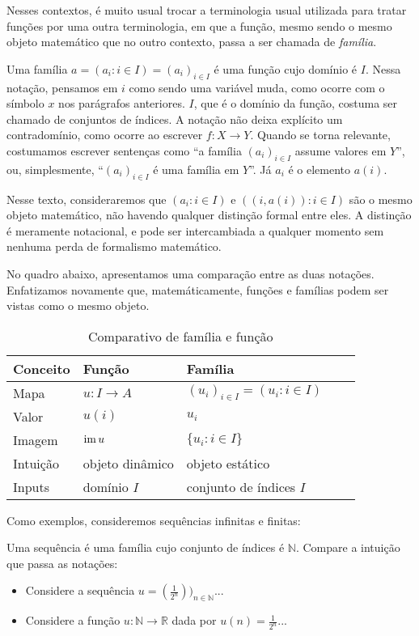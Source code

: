 Nesses contextos, é muito usual trocar a terminologia usual utilizada para tratar funções por uma outra terminologia, em que a função, mesmo sendo o mesmo objeto matemático que no outro contexto, passa a ser chamada de \emph{família}.

Uma família $a=(a_i: i \in I)=(a_i)_{i \in I}$ é uma função cujo domínio é $I$.
Nessa notação, pensamos em $i$ como sendo uma variável muda, como ocorre com o símbolo $x$ nos parágrafos anteriores.
$I$, que é o domínio da função, costuma ser chamado de conjuntos de índices.
A notação não deixa explícito um contradomínio, como ocorre ao escrever $f:X\rightarrow Y$.
Quando se torna relevante, costumamos escrever sentenças como ``a família $(a_i)_{i \in I}$ assume valores em $Y$'', ou, simplesmente, ``$(a_i)_{i \in I}$ é uma família em $Y$''.
Já $a_i$ é o elemento $a(i)$.

Nesse texto, consideraremos que $(a_i: i \in I)$ e $((i, a(i)): i \in I)$ são o mesmo objeto matemático, não havendo qualquer distinção formal entre eles.
A distinção é meramente notacional, e pode ser intercambiada a qualquer momento sem nenhuma perda de formalismo matemático.

No quadro abaixo, apresentamos uma comparação entre as duas notações.
Enfatizamos novamente que, matemáticamente, funções e famílias podem ser vistas como o mesmo objeto.
\begin{table}[h]
    \centering
    \begin{tabular}{lllll}
        \hline
        \textbf{Conceito} & \textbf{Função} & \textbf{Família} \\ \hline
        Mapa & $u:I\rightarrow A$ & $(u_i)_{i \in I}=(u_i: i \in I)$ \\
        Valor & $u(i)$ & $u_i$ \\
        Imagem & $\operatorname{im} u$ & $\{u_i: i \in I\}$\\
        Intuição & objeto dinâmico & objeto estático \\
        Inputs & domínio $I$ & conjunto de índices $I$ \\
        \hline
    \end{tabular}
    \caption{Comparativo de família e função}
\end{table}

Como exemplos, consideremos sequências infinitas e finitas:

\begin{exemplo}[Sequências]
    Uma sequência é uma família cujo conjunto de índices é $\mathbb N$.
    Compare a intuição que passa as notações:
    \begin{itemize}
    \item Considere a sequência $u=(\frac{1}{2^n}))_{n \in \mathbb N}$...
    \item Considere a função $u:\mathbb N\rightarrow \mathbb R$ dada por $u(n)=\frac{1}{2^n}$...
    \end{itemize}
\end{exemplo}

